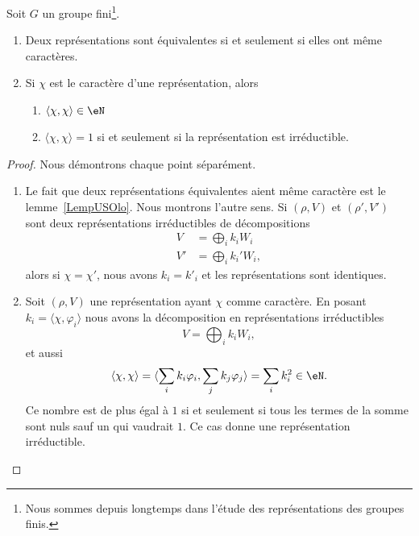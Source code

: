 \begin{theorem} \label{ThoWGkfADd}
	Soit \( G\) un groupe fini\footnote{Nous sommes depuis longtemps dans l'étude des représentations des groupes finis.}.
	\begin{enumerate}
		\item   \label{ItemZReOWoHi}
		      Deux représentations sont équivalentes si et seulement si elles ont même caractères.
		\item   \label{ItemZReOWoHii}
		      Si \( \chi\) est le caractère d'une représentation, alors
		      \begin{enumerate}
			      \item
			            \( \langle \chi, \chi\rangle \in \eN\)
			      \item
			            \( \langle \chi, \chi\rangle =1\) si et seulement si la représentation est irréductible.
		      \end{enumerate}
	\end{enumerate}
\end{theorem}

\begin{proof}
	Nous démontrons chaque point séparément.
	\begin{enumerate}
		\item

		      Le fait que deux représentations équivalentes aient même caractère est le lemme~\ref{LempUSOlo}. Nous montrons l'autre sens. Si \( (\rho,V)\) et \( (\rho',V')\) sont deux représentations irréductibles de décompositions
		      \begin{subequations}
			      \begin{align}
				      V  & =\bigoplus_ik_iW_i   \\
				      V' & =\bigoplus_ik_i'W_i,
			      \end{align}
		      \end{subequations}
		      alors si \( \chi=\chi'\), nous avons \( k_i=k'_i\) et les représentations sont identiques.

		\item

		      Soit \( (\rho,V)\) une représentation ayant \( \chi\) comme caractère. En posant \( k_i=\langle \chi, \varphi_i\rangle \) nous avons la décomposition en représentations irréductibles
		      \begin{equation}
			      V=\bigoplus_ik_iW_i,
		      \end{equation}
		      et aussi
		      \begin{equation}
			      \langle \chi, \chi\rangle =\langle \sum_ik_i\varphi_i, \sum_jk_j\varphi_j\rangle =\sum_ik_i^2\in \eN.
		      \end{equation}
		      Ce nombre est de plus égal à \( 1\) si et seulement si tous les termes de la somme sont nuls sauf un qui vaudrait \( 1\). Ce cas donne une représentation irréductible.

	\end{enumerate}

\end{proof}

